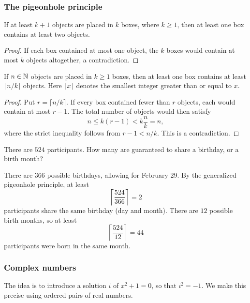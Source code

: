 \documentclass[11pt,a4paper]{amsart}
\begin{document}
\subsubsection{The pigeonhole principle}

\begin{theorem}
  If at least \(k+1\) objects are placed in \(k\) boxes, where
  \(k\geq1\), then at least one box contains at least two objects.
\end{theorem}

\begin{proof}
  If each box contained at most one object, the \(k\) boxes would
  contain at most \(k\) objects altogether, a contradiction.
\end{proof}

\begin{theorem}
  If \(n\in\mathbb{N}\) objects are placed in \(k\geq1\) boxes, then at
  least one box contains at least \(\lceil n/k\rceil\) objects.
  Here \(\lceil x\rceil\) denotes the smallest integer greater than
  or equal to \(x\).
\end{theorem}

\begin{proof}
  Put \(r=\lceil n/k\rceil\). If every box contained fewer than
  \(r\) objects, each would contain at most \(r-1\). The total
  number of objects would then satisfy
  \[
    n\leq k(r-1)<k\frac{n}{k}=n,
  \]
  where the strict inequality follows from \(r-1<n/k\).
  This is a contradiction.
\end{proof}

\begin{example}
  There are \(524\) participants. How many are guaranteed to share
  a birthday, or a birth month?

  There are \(366\) possible birthdays, allowing for February 29.
  By the generalized pigeonhole principle, at least
  \[
    \left\lceil\frac{524}{366}\right\rceil=2
  \]
  participants share the same birthday (day and month). There are
  \(12\) possible birth months, so at least
  \[
    \left\lceil\frac{524}{12}\right\rceil=44
  \]
  participants were born in the same month.
\end{example}

\subsubsection{Complex numbers}

The idea is to introduce a solution \(i\) of \(x^2+1=0\), so that
\(i^2=-1\). We make this precise using ordered pairs of real numbers.
\end{document}

